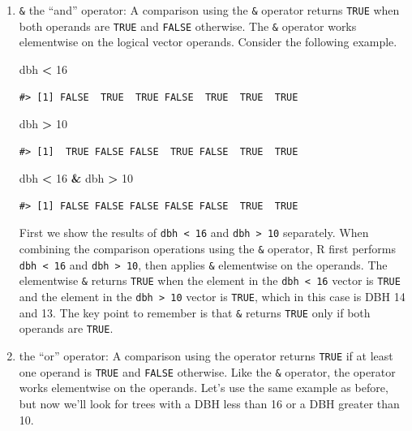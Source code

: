 \documentclass[
  11pt,
]{krantz}
\newenvironment{Shaded}{\begin{snugshade}}{\end{snugshade}}
\newcommand{\DecValTok}[1]{\textcolor[rgb]{0.00,0.00,0.81}{#1}}
\newcommand{\NormalTok}[1]{#1}
\newcommand{\OperatorTok}[1]{\textcolor[rgb]{0.81,0.36,0.00}{\textbf{#1}}}
\newcommand{\StringTok}[1]{\textcolor[rgb]{0.31,0.60,0.02}{#1}}
\theoremstyle{definition}
\theoremstyle{definition}
\theoremstyle{definition}
\theoremstyle{definition}
\theoremstyle{remark}
\begin{document}
\begin{enumerate}
\def\labelenumi{\arabic{enumi}.}
\item
  \texttt{\&} the ``and'' operator: A comparison using the \texttt{\&} operator returns \texttt{TRUE} when both operands are \texttt{TRUE} and \texttt{FALSE} otherwise. The \texttt{\&} operator works elementwise on the logical vector operands. Consider the following example.

\begin{Shaded}
\begin{Highlighting}[]
\NormalTok{dbh }\OperatorTok{\textless{}}\StringTok{ }\DecValTok{16}
\end{Highlighting}
\end{Shaded}

\begin{verbatim}
#> [1] FALSE  TRUE  TRUE FALSE  TRUE  TRUE  TRUE
\end{verbatim}

\begin{Shaded}
\begin{Highlighting}[]
\NormalTok{dbh }\OperatorTok{\textgreater{}}\StringTok{ }\DecValTok{10}
\end{Highlighting}
\end{Shaded}

\begin{verbatim}
#> [1]  TRUE FALSE FALSE  TRUE FALSE  TRUE  TRUE
\end{verbatim}

\begin{Shaded}
\begin{Highlighting}[]
\NormalTok{dbh }\OperatorTok{\textless{}}\StringTok{ }\DecValTok{16} \OperatorTok{\&}\StringTok{ }\NormalTok{dbh }\OperatorTok{\textgreater{}}\StringTok{ }\DecValTok{10}
\end{Highlighting}
\end{Shaded}

\begin{verbatim}
#> [1] FALSE FALSE FALSE FALSE FALSE  TRUE  TRUE
\end{verbatim}

  First we show the results of \texttt{dbh\ \textless{}\ 16} and \texttt{dbh\ \textgreater{}\ 10} separately. When combining the comparison operations using the \texttt{\&} operator, R first performs \texttt{dbh\ \textless{}\ 16} and \texttt{dbh\ \textgreater{}\ 10}, then applies \texttt{\&} elementwise on the operands. The elementwise \texttt{\&} returns \texttt{TRUE} when the element in the \texttt{dbh\ \textless{}\ 16} vector is \texttt{TRUE} and the element in the \texttt{dbh\ \textgreater{}\ 10} vector is \texttt{TRUE}, which in this case is DBH 14 and 13. The key point to remember is that \texttt{\&} returns \texttt{TRUE} only if both operands are \texttt{TRUE}.
\item
  \texttt{\textbar{}} the ``or'' operator: A comparison using the \texttt{\textbar{}} operator returns \texttt{TRUE} if at least one operand is \texttt{TRUE} and \texttt{FALSE} otherwise. Like the \texttt{\&} operator, the \texttt{\textbar{}} operator works elementwise on the operands. Let's use the same example as before, but now we'll look for trees with a DBH less than 16 or a DBH greater than 10.


\end{enumerate}
\end{document}
